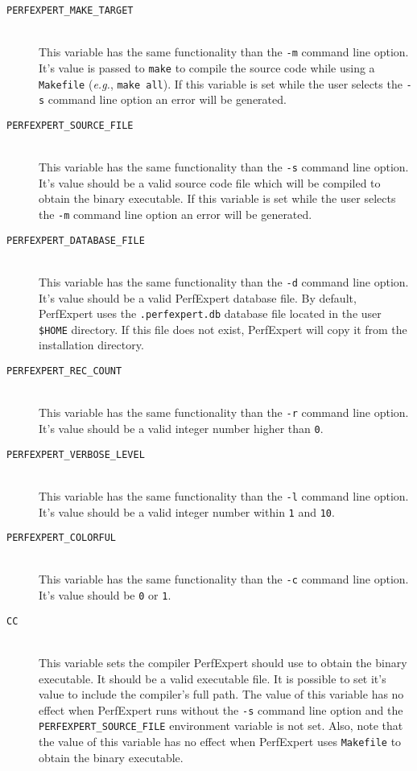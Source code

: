 \begin{description}
	\item[\texttt{PERFEXPERT\_MAKE\_TARGET}]\hfill \\
	This variable has the same functionality than the \texttt{-m} command line option. It's value is passed to \texttt{make} to compile the source code while using a \texttt{Makefile} (\textit{e.g.}, \texttt{make all}). If this variable is set while the user selects the \texttt{-s} command line option an error will be generated.

	\item[\texttt{PERFEXPERT\_SOURCE\_FILE}]\hfill \\
	This variable has the same functionality than the \texttt{-s} command line option. It's value should be a valid source code file which will be compiled to obtain the binary executable. If this variable is set while the user selects the \texttt{-m} command line option an error will be generated.

	\item[\texttt{PERFEXPERT\_DATABASE\_FILE}]\hfill \\
	This variable has the same functionality than the \texttt{-d} command line option. It's value should be a valid PerfExpert database file. By default, PerfExpert uses the \texttt{.perfexpert.db} database file located in the user \texttt{\$HOME} directory. If this file does not exist, PerfExpert will copy it from the installation directory.

	\item[\texttt{PERFEXPERT\_REC\_COUNT}]\hfill \\
	This variable has the same functionality than the \texttt{-r} command line option. It's value should be a valid integer number higher than \texttt{0}.

	\item[\texttt{PERFEXPERT\_VERBOSE\_LEVEL}]\hfill \\
	This variable has the same functionality than the \texttt{-l} command line option. It's value should be a valid integer number within \texttt{1} and \texttt{10}.

	\item[\texttt{PERFEXPERT\_COLORFUL}]\hfill \\
	This variable has the same functionality than the \texttt{-c} command line option. It's value should be \texttt{0} or \texttt{1}.
	
	\item[\texttt{CC}]\hfill \\
	This variable sets the compiler PerfExpert should use to obtain the binary executable. It should be a valid executable file. It is possible to set it's value to include the compiler's full path. The value of this variable has no effect when PerfExpert runs without the \texttt{-s} command line option and the \texttt{PERFEXPERT\_SOURCE\_FILE} environment variable is not set. Also, note that the value of this variable has no effect when PerfExpert uses \texttt{Makefile} to obtain the binary executable.


\end{description}
